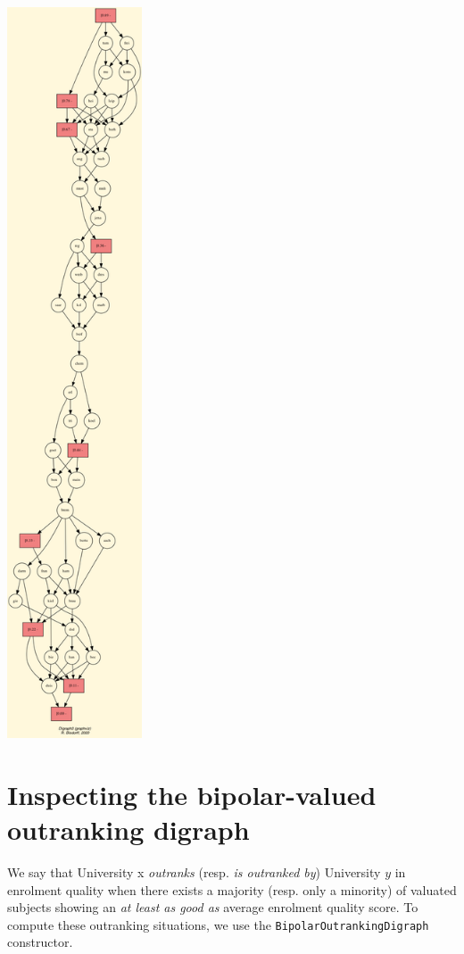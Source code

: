 \begin{minipage}{4cm}
\begin{center}
\includegraphics[width=4cm]{Figures/fusionResult.png}\\
\end{center}
\end{minipage}

\section{Inspecting the bipolar-valued outranking digraph}
\label{sec:14.2}

We say that University x \emph{outranks} (resp. \emph{is outranked by}) University $y$ in enrolment quality when there exists a majority (resp. only a minority) of valuated subjects showing an \emph{at least as good as} average enrolment quality score. To compute these outranking situations, we use the \texttt{BipolarOutrankingDigraph} constructor.

